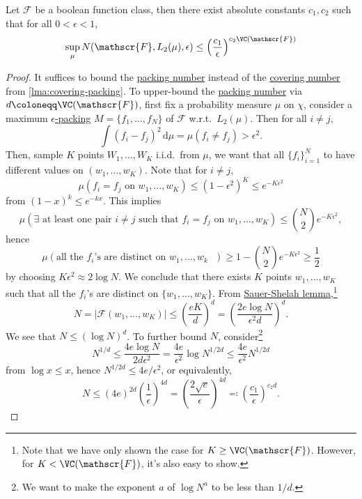 \begin{theorem}[Dudley]\label{thm:Dudley}
	Let \(\mathscr{F} \) be a boolean function class, then there exist absolute constants \(c_1, c_2\) such that for all \(0 < \epsilon < 1\),
	\[
		\sup _\mu N(\mathscr{F} , L_2(\mu ), \epsilon ) \leq \left( \frac{c_1}{\epsilon } \right) ^{c_2 \VC(\mathscr{F} )}
	\]
\end{theorem}
\begin{proof}
	It suffices to bound the \hyperref[def:packing-number]{packing number} instead of the \hyperref[def:covering-number]{covering number} from \autoref{lma:covering-packing}. To upper-bound the \hyperref[def:packing-number]{packing number} via \(d\coloneqq \VC(\mathscr{F} )\), first fix a probability measure \(\mu \) on \(\chi \), consider a maximum \hyperref[def:eps-packing]{\(\epsilon\)-packing} \(M=\{ f_1, \dots , f_N \} \) of \(\mathscr{F} \) w.r.t.\ \(L_2(\mu )\). Then for all \(i \neq j\),
	\[
		\int (f_i - f_j)^2 \,\mathrm{d} \mu
		= \mu (f_i \neq f_j)
		> \epsilon ^2.
	\]
	Then, sample \(K\) points \(W_1, \dots , W_K\) i.i.d.\ from \(\mu \), we want that all \(\{ f_i \}_{i=1}^N \) to have different values on \((w_1, \dots , w_K)\). Note that for \(i \neq j\),
	\[
		\mu (f_i = f_j \text{ on } w_1, \dots , w_K)
		\leq (1-\epsilon ^2)^K
		\leq e^{-K \epsilon ^2}
	\]
	from \((1-x)^k \leq e^{-kx}\). This implies
	\[
		\mu  (\exists \text{ at least one pair \(i\neq j\) such that \(f_i = f_j\) on \(w_1, \dots , w_K\)}) \leq \binom{N}{2}e^{-K \epsilon ^2},
	\]
	hence
	\[
		\mu (\text{all the \(f_i\)'s are distinct on \(w_1, \dots , w_k\) }) \geq 1 - \binom{N}{2}e^{-K\epsilon ^2} \geq \frac{1}{2}
	\]
	by choosing \(K\epsilon ^2 \approx 2 \log N\). We conclude that there exists \(K\) points \(w_1, \dots , w_K\) such that all the \(f_i\)'s are distinct on \(\{ w_1, \dots , w_K \} \). From \hyperref[lma:Sauer-Shelah]{Sauer-Shelah lemma},\footnote{Note that we have only shown the case for \(K \geq \VC(\mathscr{F} )\). However, for \(K < \VC(\mathscr{F} )\), it's also easy to show.}
	\[
		N
		= \vert \mathscr{F} (w_1, \dots , w_K) \vert
		\leq \left( \frac{eK}{d} \right) ^{d}
		= \left( \frac{2e \log N}{\epsilon ^2 d} \right) ^d.
	\]
	We see that \(N \leq (\log N)^d\). To further bound \(N\), consider\footnote{We want to make the exponent \(a\) of \(\log N^a\) to be less than \(1 / d\).}
	\[
		N^{1 / d} \leq \frac{4e \log N}{2 d \epsilon ^2} = \frac{4e}{\epsilon ^2} \log N^{1 / 2d} \leq \frac{4e}{\epsilon ^2} N^{1 / 2d}
	\]
	from \(\log x \leq x\), hence \(N^{1 / 2d} \leq 4e / \epsilon ^2\), or equivalently,
	\[
		N
		\leq (4e)^{2d} \left( \frac{1}{\epsilon } \right) ^{4d}
		= \left( \frac{2\sqrt{e} }{\epsilon } \right) ^{4d}
		\eqqcolon \left( \frac{c_1}{\epsilon } \right) ^{c_2 d}.
	\]
\end{proof}

